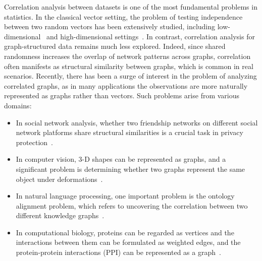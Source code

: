 \documentclass[letterpaper,11pt]{article}
\theoremstyle{definition}
\begin{document}
Correlation analysis between datasets is one of the most fundamental problems in statistics. %
In the classical vector setting, the problem of testing independence between two random vectors has been extensively studied, including low-dimensional~\citep{pearson1900x,kendall1938new,spearman1987proof} and high-dimensional settings~\citep{szekely2007measuring,zhu2017projection,gretton2007kernel}.
In contrast, correlation analysis for graph-structured data remains much less explored. 
Indeed, since shared randomness increases the overlap of network patterns across graphs, correlation often manifests as structural similarity between graphs, which is common in real scenarios.
Recently, there has been a surge of interest in the problem of analyzing correlated graphs, as in many applications the observations are more naturally represented as graphs rather than vectors. 
Such problems arise from various domains:
\begin{itemize}
    \item In social network analysis, whether two friendship networks on different social network platforms share structural similarities is a crucial task in privacy protection~\citep{narayanan2008robust}.%
    \item In computer vision, 3-D shapes can be represented as graphs, and a significant problem is determining whether two graphs represent the same object under deformations~\citep{berg2005shape}.%
    \item In natural language processing, one important problem is the ontology alignment problem, which refers to uncovering the correlation between two different knowledge graphs~\citep{haghighi2005robust}.%
    \item In computational biology, proteins can be regarded as vertices and the interactions between them can be formulated as weighted edges, and the protein-protein interactions (PPI) can be represented as a graph~\citep{singh2008global}.%
\end{itemize}
\end{document}

